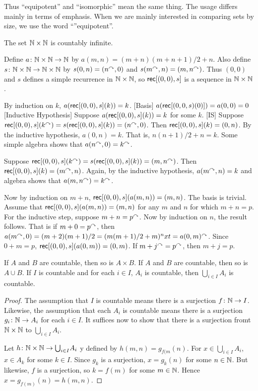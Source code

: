 Thus ``equipotent'' and ``isomorphic'' mean the same thing.
The usage differs mainly in terms of emphasis.
When we are mainly interested in comparing sets by size, we use the word ``''equipotent''. 

\begin{example}
	The set $\mathbb N\times \mathbb N$ is countably infinite.
	
	Define ${a}\colon{\mathbb N\times \mathbb N}\to{\mathbb N}$ by $a(m,n) = (m+n)(m+n+1)/2 + n$. 
	Also define ${s}\colon{\mathbb N\times \mathbb N}\to{\mathbb N\times \mathbb N}$ by
	$s(0,n) = (n^\curvearrowright,0)$ and $s(m^\curvearrowright,n) = (m,n^\curvearrowright)$.
	Thus $(0,0)$ and $s$ defines a simple recurrence in $\mathbb N\times \mathbb N$,
	so $\mathord{\textsf{rec}}[(0,0),s]$ is a sequence in $\mathbb N\times \mathbb N$. 
	
	By induction on $k$, $a(\mathord{\textsf{rec}}[(0,0),s](k)) = k$. 
	[Basis]  $a(\mathord{\textsf{rec}}[(0,0,s)(0)])=a(0,0) = 0$
	[Inductive Hypothesis] Suppose $a(\mathord{\textsf{rec}}[(0,0),s](k)) = k$ for some $k$. 
	[IS] Suppose $\mathord{\textsf{rec}}[(0,0),s](k^\curvearrowright) = s(\mathord{\textsf{rec}}[(0,0),s](k)) = (n^\curvearrowright,0)$. Then $\mathord{\textsf{rec}}[(0,0),s](k) = (0,n)$. By the inductive hypothesis, $a(0,n)=k$. That is,
	$n(n+1)/2+n = k$. Some simple algebra shows that $a(n^\curvearrowright,0)= k^\curvearrowright$.
	
	Suppose $\mathord{\textsf{rec}}[(0,0),s](k^\curvearrowright) = s(\mathord{\textsf{rec}}[(0,0),s](k)) = (m,n^\curvearrowright)$.
	Then $\mathord{\textsf{rec}}[(0,0),s](k) = (m^\curvearrowright,n)$.
	Again, by the inductive hypothesis, $a(m^\curvearrowright,n)=k$ and algebra shows 
	that $a(m,n^\curvearrowright) = k^\curvearrowright$.
	
	Now by induction on $m+n$, $\mathord{\textsf{rec}}[(0,0),s](a(m,n)) = (m,n)$.
	The basis is trivial. 
	Assume that $\mathord{\textsf{rec}}[(0,0),s](a(m,n)) = (m,n)$ for any $m$ and $n$ for which $m+n=p$. 
	For the inductive step, suppose $m+n=p^\curvearrowright$. 
	Now by induction on $n$, the result follows. 
	That is if $m+0 = p^\curvearrowright$,
	then $a(m^\curvearrowright,0)= (m+2)(m+1)/2 = (m(m+1)/2 + m)^nxt = a(0,m)^\curvearrowright$. Since $0+m=p$,
	$\mathord{\textsf{rec}}[(0,0),s](a(0,m)) = (0,m)$. If $m+j^\curvearrowright = p^\curvearrowright$, then $m+j = p$. 
	
\end{example}

\begin{lemma}
	If $A$ and $B$ are countable, then so is $A\times B$.
	If $A$ and $B$ are countable, then so is $A\cup B$.
	If $I$ is countable and for each $i\in I$, $A_i$ is countable, then $\bigcup_{i\in I}A_i$ is countable.
	
	\begin{proof}
		The assumption that $I$ is countable means there is a surjection ${f}\colon{\mathbb N}\to{I}$. Likewise, the assumption that each $A_i$ is countable means there is a surjection ${g_i}\colon{\mathbb N}\to{A_i}$ for each $i\in I$. It suffices now to show that there is a surjection fromt $\mathbb N\times \mathbb N$ to $\bigcup_{i\in I}A_i$.
		
		Let ${h}\colon{\mathbb N\times \mathbb N}\to{\bigcup}_{i\in I}A_i$ y defined by $h(m,n) = g_{f(m}(n)$. For $x\in \bigcup_{i\in I}A_i$, $x\in  A_k$ for some $k\in I$. Since $g_k$ is a surjection, $x = g_k(n)$ for some $n\in\mathbb N$. 
		But likewise, $f$ is a surjection, so $k = f(m)$ for some $m\in\mathbb N$. 
		Hence $x = g_{f(m)}(n) = h(m,n)$.
	\end{proof}
\end{lemma}

